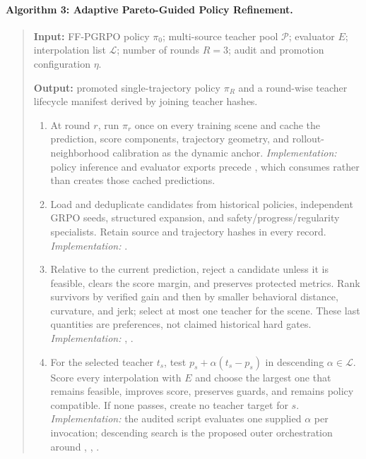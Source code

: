 \paragraph{Algorithm 3: Adaptive Pareto-Guided Policy Refinement.}
\label{alg:apr}
\begin{quote}
\small
\textbf{Input:} FF-PGRPO policy $\pi_0$; multi-source teacher pool
$\mathcal P$; evaluator $E$; interpolation list $\mathcal L$; number of rounds
$R=3$; audit and promotion configuration $\eta$.

\textbf{Output:} promoted single-trajectory policy $\pi_R$ and a round-wise
teacher lifecycle manifest derived by joining teacher hashes.

\begin{enumerate}
  \item At round $r$, run $\pi_r$ once on every training scene and cache the
  prediction, score components, trajectory geometry, and rollout-neighborhood
  calibration as the dynamic anchor.  \emph{Implementation:} policy inference
  and evaluator exports precede
  ,
  which consumes rather than creates those cached predictions.

  \item Load and deduplicate candidates from historical policies, independent
  GRPO seeds, structured expansion, and safety/progress/regularity specialists.
  Retain source and trajectory hashes in every record.  \emph{Implementation:}
  .

  \item Relative to the current prediction, reject a candidate unless it is
  feasible, clears the score margin, and preserves protected metrics.  Rank
  survivors by verified gain and then by smaller behavioral distance,
  curvature, and jerk; select at most one teacher for the scene.  These last
  quantities are preferences, not claimed historical hard gates.
  \emph{Implementation:}
  ,
  .

  \item For the selected teacher $t_s$, test
  $p_s+\alpha(t_s-p_s)$ in descending $\alpha\in\mathcal L$.  Score every
  interpolation with $E$ and choose the largest one that remains feasible,
  improves score, preserves guards, and remains policy compatible.  If none
  passes, create no teacher target for $s$.  \emph{Implementation:} the audited
  script evaluates one supplied $\alpha$ per invocation; descending search is
  the proposed outer orchestration around
  ,
  , .


\end{enumerate}
\end{quote}
